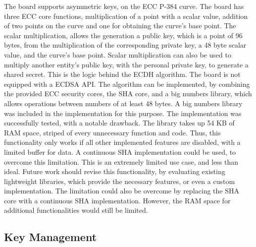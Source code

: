The board supports asymmetric keys, on the \ac{ECC} P-384 curve. The board has three \ac{ECC} core functions, multiplication of a point with a scalar value, addition of two points on the curve and one for obtaining the curve's base point. The scalar multiplication, allows the generation a public key, which is a point of 96 bytes, from the multiplication of the corresponding private key, a 48 byte scalar value, and the curve's base point. Scalar multiplication can also be used to multiply another entity's public key, with the personal private key, to generate a shared secret. This is the logic behind the \ac{ECDH} algorithm.
The board is not equipped with a \ac{ECDSA} API. The algorithm can be implemented, by combining the provided ECC security cores, the SHA core, and a big numbers library, which allows operations between numbers of at least 48 bytes.
A big numbers library was included in the implementation for this purpose. The implementation was successfully tested, with a notable drawback.
The library takes up 54 KB of RAM space, striped of every unnecessary function and code. Thus, this functionality only works if all other implemented features are disabled, with a limited buffer for data. A continuous SHA implementation could be used, to overcome this limitation.
This is an extremely limited use case, and less than ideal. Future work should revise this functionality, by evaluating existing lightweight libraries, which provide the necessary features, or even a custom implementation. The limitation could also be overcome by replacing the SHA core with a continuous SHA implementation. However, the RAM space for additional functionalities would still be limited.

\subsection{Key Management}\label{chap:implementation:services:key-import}

